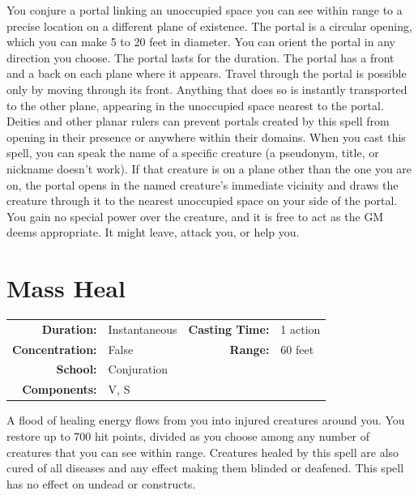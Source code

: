 \documentclass[12pt,showtrims]{memoir}
\begin{document}
\vspace{1\baselineskip}\noindent You conjure a portal linking an unoccupied space you can see within range to a precise location on a different plane of existence. The portal is a circular opening, which you can make 5 to 20 feet in diameter. You can orient the portal in any direction you choose. The portal lasts for the duration. The portal has a front and a back on each plane where it appears. Travel through the portal is possible only by moving through its front. Anything that does so is instantly transported to the other plane, appearing in the unoccupied space nearest to the portal. Deities and other planar rulers can prevent portals created by this spell from opening in their presence or anywhere within their domains. When you cast this spell, you can speak the name of a specific creature (a pseudonym, title, or nickname doesn't work). If that creature is on a plane other than the one you are on, the portal opens in the named creature's immediate vicinity and draws the creature through it to the nearest unoccupied space on your side of the portal. You gain no special power over the creature, and it is free to act as the GM deems appropriate. It might leave, attack you, or help you.

\newpage
\section*{Mass Heal}

{
\small\centering\vspace{-6pt}
\begin{tabular}{rlrl}
\toprule

\textbf{Duration:} & Instantaneous &
\textbf{Casting Time:} & 1 action \\
\textbf{Concentration:} & False &
\textbf{Range:} & 60 feet \\
\textbf{School:} & Conjuration \\
\textbf{Components:} & \multicolumn{3}{p{0.7\textwidth}}{V, S}\\

\bottomrule
\end{tabular}
}

\vspace{1\baselineskip}\noindent A flood of healing energy flows from you into injured creatures around you. You restore up to 700 hit points, divided as you choose among any number of creatures that you can see within range. Creatures healed by this spell are also cured of all diseases and any effect making them blinded or deafened. This spell has no effect on undead or constructs.
\end{document}
